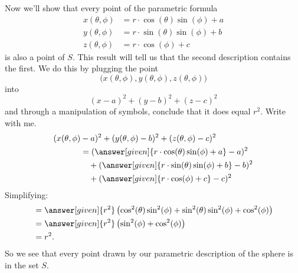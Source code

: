 \documentclass{ximera}
\begin{document}
\begin{example}
\begin{explanation}
    Now we'll show that every point of the parametric formula
    \begin{align*}
    x(\theta,\phi) &=r\cdot\cos(\theta)\sin(\phi)+a\\
    y(\theta,\phi) &=r\cdot\sin(\theta)\sin(\phi)+b\\
    z(\theta,\phi) &=r\cdot\cos(\phi)+c
    \end{align*}
    is also a point of $S$.  This result will tell us that the second description contains the first. We do this by plugging the point
    \[
    \big(x(\theta,\phi),y(\theta,\phi),z(\theta,\phi)\big)
    \]
    into 
    \[
    (x-a)^2+(y-b)^2+(z-c)^2
    \]
    and through a manipulation of symbols, conclude that it does equal
    $r^2$. Write with me.
    \begin{align*}
      (x(\theta,\phi)&-a)^2+(y(\theta,\phi)-b)^2+(z(\theta,\phi)-c)^2 \\
      &= (\answer[given]{r\cdot\cos(\theta)\sin(\phi)+a}-a)^2\\
      &\quad +(\answer[given]{r\cdot\sin(\theta)\sin(\phi)+b}-b)^2\\
      &\quad +(\answer[given]{r\cdot\cos(\phi)+c}-c)^2
    \end{align*}
    Simplifying:
    \begin{align*}
      &= \answer[given]{r^2}\left(\cos^2(\theta)\sin^2(\phi) + \sin^2(\theta)\sin^2(\phi) + \cos^2(\phi)\right)\\
      &= \answer[given]{r^2}\left(\sin^2(\phi) + \cos^2(\phi)\right)\\
      &= r^2.
    \end{align*}
    So we see that every point drawn by our parametric description of
    the sphere is in the set $S$.



    
  \end{explanation}
\end{example}
\end{document}

